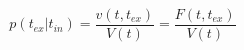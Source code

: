 \begin{equation}
p(t_{ex}|t_{in})  = \frac{v(t,t_{ex})}{V(t)}= \frac{F(t,t_{ex})}{V(t)}
\end{equation}